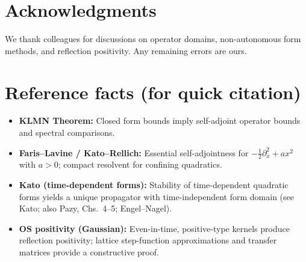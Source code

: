 \documentclass[11pt]{article}
\theoremstyle{plain}
\theoremstyle{definition}
\theoremstyle{remark}
\begin{document}
\section*{Acknowledgments}
We thank colleagues for discussions on operator domains, non-autonomous form methods, and reflection positivity. Any remaining errors are ours.

\appendix
\section{Reference facts (for quick citation)}\label{app:ref}
\begin{itemize}[leftmargin=*]
  \item \textbf{KLMN Theorem:} Closed form bounds imply self-adjoint operator bounds and spectral comparisons.
  \item \textbf{Faris--Lavine / Kato--Rellich:} Essential self-adjointness for $-\tfrac12\partial_x^2 + a x^2$ with $a>0$; compact resolvent for confining quadratics.
  \item \textbf{Kato (time-dependent forms):} Stability of time-dependent quadratic forms yields a unique propagator with time-independent form domain (see Kato; also Pazy, Chs.~4--5; Engel--Nagel).
  \item \textbf{OS positivity (Gaussian):} Even-in-time, positive-type kernels produce reflection positivity; lattice step-function approximations and transfer matrices provide a constructive proof.
\end{itemize}

% 
% 
\end{document}
